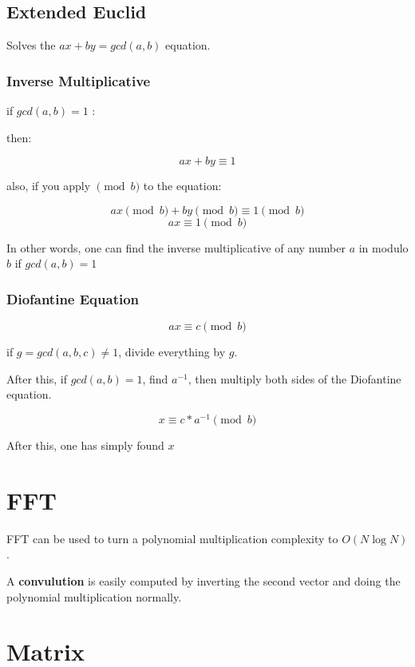	
\subsection{Extended Euclid}
	
	Solves the $ ax + by = gcd(a, b)$ equation.

	\subsubsection{Inverse Multiplicative}

	if \textbf{ $gcd(a, b) = 1$ }:

	then:

	$$ax + by \equiv 1$$

	also, if you apply $\pmod{b}$ to the equation:

	$$ ax \pmod{b} + by \pmod{b} \equiv 1 \pmod{b} $$
	$$ ax \equiv 1 \pmod{b} $$

	In other words, one can find the inverse multiplicative of any number $a$ in modulo $b$ if $gcd(a, b) = 1$

	\subsubsection{Diofantine Equation}

	$$ ax \equiv c \pmod{b} $$

	if $g = gcd({a, b, c}) \neq 1$, divide everything by $g$.

	After this, if $gcd(a, b) = 1$, find $a^{-1}$, then multiply both sides of the Diofantine equation.

	$$ x \equiv c * a^{-1} \pmod{b} $$

	After this, one has simply found $x$



\section{FFT}

	FFT can be used to turn a polynomial multiplication complexity to $O(N \log{N})$.

	A \textbf{convulution} is easily computed by inverting the second vector and doing the polynomial multiplication normally.


\section{Matrix}

